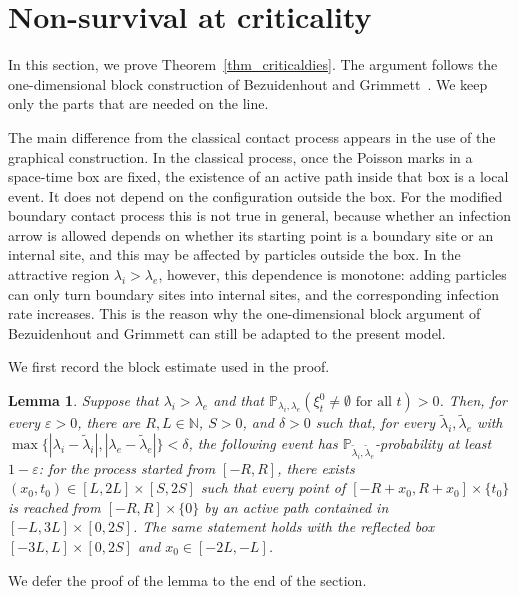 \documentclass[11pt,a4paper]{article}
\theoremstyle{plain}
\newtheorem{lemma}[theorem]{Lemma}
\theoremstyle{definition}
\theoremstyle{remark}
\numberwithin{equation}{section}
\begin{document}
	
	
	\section{Non-survival at criticality} \label{section_criticaldies}
	
	In this section, we prove Theorem~\ref{thm_criticaldies}. The argument follows the one-dimensional block construction of Bezuidenhout and Grimmett~\cite{BG90}. We keep only the parts that are needed on the line.
	
	The main difference from the classical contact process appears in the use of the graphical construction. In the classical process, once the Poisson marks in a space-time box are fixed, the existence of an active path inside that box is a local event. It does not depend on the configuration outside the box. For the modified boundary contact process this is not true in general, because whether an infection arrow is allowed depends on whether its starting point is a boundary site or an internal site, and this may be affected by particles outside the box. In the attractive region $\lambda_i>\lambda_e$, however, this dependence is monotone: adding particles can only turn boundary sites into internal sites, and the corresponding infection rate increases. This is the reason why the one-dimensional block argument of Bezuidenhout and Grimmett can still be adapted to the present model.
	
	We first record the block estimate used in the proof.
	
	\begin{lemma} \label{lemma_connected_interval}
		Suppose that $\lambda_i>\lambda_e$ and that $\mathbb{P}_{\lambda_i,\lambda_e}(\xi^0_t\neq\emptyset \text{ for all }t)>0$. Then, for every $\varepsilon>0$, there are $R,L\in\mathbb{N}$, $S>0$, and $\delta>0$ such that, for every $\tilde\lambda_i,\tilde\lambda_e$ with $\max\{|\lambda_i-\tilde\lambda_i|,|\lambda_e-\tilde\lambda_e|\}<\delta$, the following event has $\mathbb{P}_{\tilde\lambda_i,\tilde\lambda_e}$-probability at least $1-\varepsilon$: for the process started from $[-R,R]$, there exists $(x_0,t_0)\in[L,2L]\times[S,2S]$ such that every point of $[-R+x_0,R+x_0]\times\{t_0\}$ is reached from $[-R,R]\times\{0\}$ by an active path contained in $[-L,3L]\times[0,2S]$. The same statement holds with the reflected box $[-3L,L]\times[0,2S]$ and $x_0\in[-2L,-L]$.
	\end{lemma}
	
	We defer the proof of the lemma to the end of the section.
	
\end{document}
